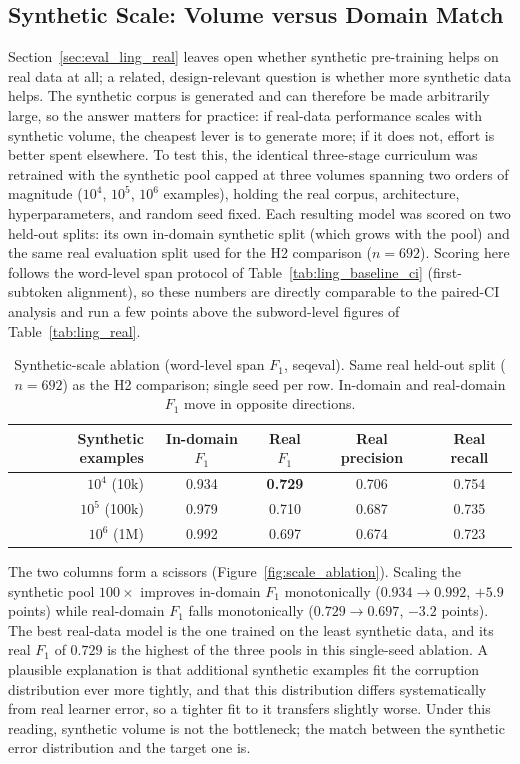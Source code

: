 \subsection{Synthetic Scale: Volume versus Domain Match}
\label{sec:eval_ling_scale}

Section~\ref{sec:eval_ling_real} leaves open whether synthetic pre-training helps on real data at all; a related, design-relevant question is whether more synthetic data helps. The synthetic corpus is generated and can therefore be made arbitrarily large, so the answer matters for practice: if real-data performance scales with synthetic volume, the cheapest lever is to generate more; if it does not, effort is better spent elsewhere. To test this, the identical three-stage curriculum was retrained with the synthetic pool capped at three volumes spanning two orders of magnitude ($10^4$, $10^5$, $10^6$ examples), holding the real corpus, architecture, hyperparameters, and random seed fixed. Each resulting model was scored on two held-out splits: its own in-domain synthetic split (which grows with the pool) and the same real evaluation split used for the H2 comparison ($n = 692$). Scoring here follows the word-level span protocol of Table~\ref{tab:ling_baseline_ci} (first-subtoken alignment), so these numbers are directly comparable to the paired-CI analysis and run a few points above the subword-level figures of Table~\ref{tab:ling_real}.

\begin{table}[h]
\centering
\caption[Synthetic-scale ablation (word-level span $F_1$, seqeval).]{Synthetic-scale ablation (word-level span $F_1$, seqeval). Same real held-out split ($n=692$) as the H2 comparison; single seed per row. In-domain and real-domain $F_1$ move in opposite directions.}
\label{tab:ling_scale}
\begin{tabular}{rcccc}
\toprule
\textbf{Synthetic examples} & \textbf{In-domain $F_1$} & \textbf{Real $F_1$} & \textbf{Real precision} & \textbf{Real recall} \\
\midrule
$10^4$ (10k)   & 0.934 & \textbf{0.729} & 0.706 & 0.754 \\
$10^5$ (100k)  & 0.979 & 0.710 & 0.687 & 0.735 \\
$10^6$ (1M)    & 0.992 & 0.697 & 0.674 & 0.723 \\
\bottomrule
\end{tabular}
\end{table}

The two columns form a scissors (Figure~\ref{fig:scale_ablation}). Scaling the synthetic pool $100\times$ improves in-domain $F_1$ monotonically ($0.934 \rightarrow 0.992$, $+5.9$ points) while real-domain $F_1$ falls monotonically ($0.729 \rightarrow 0.697$, $-3.2$ points). The best real-data model is the one trained on the least synthetic data, and its real $F_1$ of $0.729$ is the highest of the three pools in this single-seed ablation. A plausible explanation is that additional synthetic examples fit the corruption distribution ever more tightly, and that this distribution differs systematically from real learner error, so a tighter fit to it transfers slightly worse. Under this reading, synthetic volume is not the bottleneck; the match between the synthetic error distribution and the target one is.

